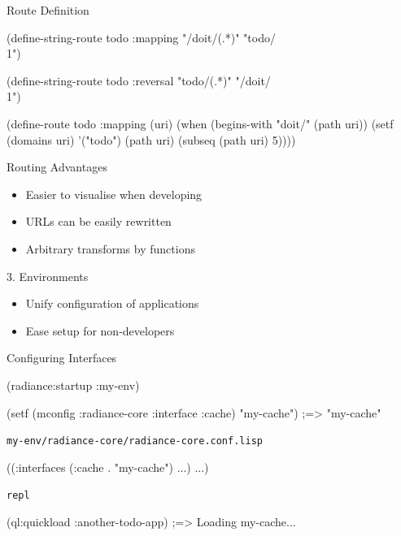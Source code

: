 \documentclass[14pt,t]{beamer}
\def\code#1{{\color{codecolor}\texttt{#1}}}
\renewcommand{\title}[1]{
  {\huge #1} \vskip 0.4cm
}
\begin{document}
\begin{frame}[fragile]
  \title{Route Definition}
\begin{lispcode}
(define-string-route todo :mapping
  "/doit/(.*)" "todo/\\1")

(define-string-route todo :reversal
  "todo/(.*)" "/doit/\\1")
\end{lispcode}
  \pause \vskip 1.0cm
\begin{lispcode}
(define-route todo :mapping (uri)
  (when (begins-with "doit/" (path uri))
    (setf (domains uri) '("todo")
          (path uri) (subseq (path uri) 5))))
\end{lispcode}
\end{frame}

\begin{frame}
  \title{Routing Advantages}
  \begin{itemize}
  \item Easier to visualise when developing
  \item URLs can be easily rewritten
  \item Arbitrary transforms by functions
  \end{itemize}
\end{frame}

\begin{frame}
  \title{3. Environments}
  \begin{itemize}
  \item Unify configuration of applications
  \item Ease setup for non-developers
  \end{itemize}
\end{frame}

\begin{frame}[fragile]
  \title{Configuring Interfaces}
\begin{lispcode}
(radiance:startup :my-env)

(setf (mconfig :radiance-core :interface :cache)
      "my-cache")
  ;=> "my-cache"
\end{lispcode}
  \pause
  \vskip 0.5cm
  {\footnotesize\code{my-env/radiance-core/radiance-core.conf.lisp}}
\begin{lispcode}
((:interfaces (:cache . "my-cache")
              ...)
 ...)
\end{lispcode}
  \pause
  \vskip 0.5cm
  {\footnotesize\code{repl}}
\begin{lispcode}
(ql:quickload :another-todo-app)
  ;=> Loading my-cache...
\end{lispcode}
\end{frame}
\end{document}
